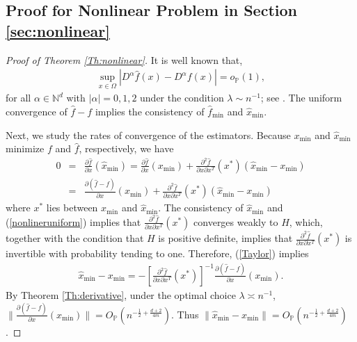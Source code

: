 \documentclass[12pt]{article}
\theoremstyle{plain}
\theoremstyle{remark}
\begin{document}
\subsection{Proof for Nonlinear Problem in Section \ref{sec:nonlinear}}\label{sub:nonlinear}
\begin{proof}[Proof of Theorem \ref{Th:nonlinear}]
    It is well known that, 
    \begin{eqnarray}\label{nonlineruniform}
        \sup_{x\in\Omega}|D^\alpha\hat{f}(x)-D^\alpha f(x)|=o_\mathbb{P}(1),
    \end{eqnarray}
    for all $\alpha\in\mathbb{N}^d$ with $|\alpha|=0,1,2$ under the condition $\lambda\sim n^{-1}$; see \cite{geer2000empirical}.
    The uniform convergence of $\hat{f}-f$ implies the consistency of $\hat{f}_{\min}$ and $\hat{x}_{\min}$.

    Next, we study the rates of convergence of the estimators. Because $x_{\min}$ and $\hat{x}_{\min}$ minimize $f$ and $\hat{f}$, respectively, we have
    \begin{eqnarray}
        0&=&\frac{\partial\hat{f}}{\partial x}(\hat{x}_{\min})=\frac{\partial\hat{f}}{\partial x}(x_{\min})+\frac{\partial^2\hat{f}}{\partial x\partial x^T}(x^*)(\hat{x}_{\min}-x_{\min})\nonumber\\
        &=&\frac{\partial(\hat{f}-f)}{\partial x}(x_{\min})+\frac{\partial^2\hat{f}}{\partial x\partial x^T}(x^*)(\hat{x}_{\min}-x_{\min})\label{Taylor}
    \end{eqnarray}
    where $x^*$ lies between $x_{\min}$ and $\hat{x}_{\min}$. The consistency of $\hat{x}_{\min}$ and (\ref{nonlineruniform}) implies that $\frac{\partial^2\hat{f}}{\partial x\partial x^T}(x^*)$ converges weakly to $H$, which, together with the condition that $H$ is positive definite, implies that $\frac{\partial^2\hat{f}}{\partial x\partial x^T}(x^*)$ is invertible with probability tending to one. Therefore, (\ref{Taylor}) implies
    \begin{eqnarray}\label{nonlinearerror}
        \hat{x}_{\min}-x_{\min}=-\left[\frac{\partial^2\hat{f}}{\partial x\partial x^T}(x^*)\right]^{-1}\frac{\partial(\hat{f}-f)}{\partial x}(x_{\min}).
    \end{eqnarray}
    By Theorem \ref{Th:derivative}, under the optimal choice $\lambda\asymp n^{-1}$, $\|\frac{\partial(\hat{f}-f)}{\partial x}(x_{\min})\|=O_\mathbb{P}(n^{-\frac{1}{2}+\frac{d+2}{4m}})$. Thus $\|\hat{x}_{\min}-x_{\min}\|=O_\mathbb{P}(n^{-\frac{1}{2}+\frac{d+2}{4m}})$.


\end{proof}
\end{document}

